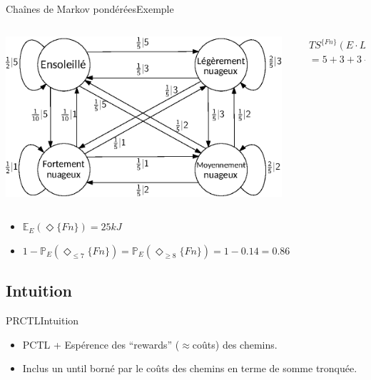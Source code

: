 \documentclass[compress]{beamer}
\begin{document}
\begin{frame}{Chaînes de Markov pondérées}{Exemple}
  \begin{columns}
    \begin{column}{0.5\linewidth}
      \includegraphics[width=\linewidth]{resources/weather}
    \end{column}
    \begin{column}{0.5\linewidth}
        \begin{align*}
          &TS^{\{Fn\}}(E \cdot Ln \cdot Ln \cdot Mn \cdot Fn\, \dots)& \\
          &= 5+3+3+2 = 13&
        \end{align*}
    \end{column}
  \end{columns}
  \begin{itemize}
    \item $\mathbb{E}_{E}(\Diamond{\{Fn\}}) = 25 kJ$
    \item $1 - \mathbb{P}_{E}(\Diamond_{\leq 7}\{Fn\}) =
      \mathbb{P}_{E}(\Diamond_{\geq 8}\{Fn\}) = 1 - 0.14 = 0.86 $
  \end{itemize}
\end{frame}

\subsection{Intuition}
\begin{frame}{PRCTL}{Intuition}
  \begin{itemize}
    \item PCTL + Espérence des ``rewards'' ($\approx$coûts) des chemins.
    \item Inclus un until borné par le coûts des chemins en terme de somme tronquée.
  \end{itemize}
\end{frame}
\end{document}
